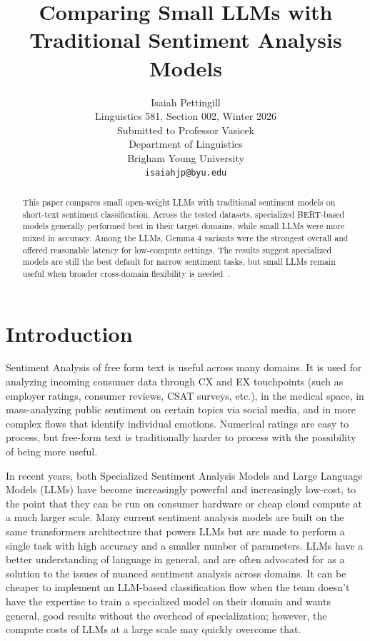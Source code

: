 \documentclass[11pt,table,xcdraw]{article}
\title{Comparing Small LLMs with Traditional Sentiment Analysis Models}
\author{Isaiah Pettingill \\
  Linguistics 581, Section 002, Winter 2026 \\
  Submitted to Professor Vasicek \\
  Department of Linguistics \\
  Brigham Young University \\
  {\tt isaiahjp@byu.edu} }
\begin{document}
\maketitle

\begin{abstract}
This paper compares small open-weight LLMs with traditional sentiment models on short-text sentiment classification. Across the tested datasets, specialized BERT-based models generally performed best in their target domains, while small LLMs were more mixed in accuracy. Among the LLMs, Gemma 4 variants were the strongest overall and offered reasonable latency for low-compute settings. The results suggest specialized models are still the best default for narrow sentiment tasks, but small LLMs remain useful when broader cross-domain flexibility is needed~\cite{gpt53codex}.
\end{abstract}

\section{Introduction}
Sentiment Analysis of free form text is useful across many domains. It is used for analyzing incoming consumer data through CX and EX touchpoints (such as employer ratings, consumer reviews, CSAT surveys, etc.), in the medical space, in mass-analyzing public sentiment on certain topics via social media, and in more complex flows that identify individual emotions. Numerical ratings are easy to process, but free-form text is traditionally harder to process with the possibility of being more useful.

In recent years, both Specialized Sentiment Analysis Models and Large Language Models (LLMs) have become increasingly powerful and increasingly low-cost, to the point that they can be run on consumer hardware or cheap cloud compute at a much larger scale. Many current sentiment analysis models are built on the same transformers architecture that powers LLMs but are made to perform a single task with high accuracy and a smaller number of parameters. LLMs have a better understanding of language in general, and are often advocated for as a solution to the issues of nuanced sentiment analysis across domains. It can be cheaper to implement an LLM-based classification flow when the team doesn't have the expertise to train a specialized model on their domain and wants general, good results without the overhead of specialization; however, the compute costs of LLMs at a large scale may quickly overcome that.
\end{document}
